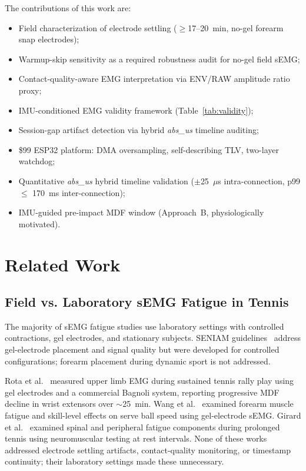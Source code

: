 \documentclass[sensors,article,submit,pdftex,moreauthors]{Definitions/mdpi}
\begin{document}
The contributions of this work are:
\begin{itemize}
  \item[(C1)] Field characterization of electrode settling ($\geq$17--20~min,
    no-gel forearm snap electrodes);
  \item[(C2)] Warmup-skip sensitivity as a required robustness audit for no-gel field sEMG;
  \item[(C3)] Contact-quality-aware EMG interpretation via ENV/RAW amplitude ratio proxy;
  \item[(C4)] IMU-conditioned EMG validity framework (Table~\ref{tab:validity});
  \item[(C5)] Session-gap artifact detection via hybrid \textit{abs\_us} timeline auditing;
  \item[(C6)] \$99 ESP32 platform: DMA oversampling, self-describing TLV, two-layer watchdog;
  \item[(C7)] Quantitative \textit{abs\_us} hybrid timeline validation ($\pm$25~$\mu$s
    intra-connection, p99 $\leq$ 170~ms inter-connection);
  \item[(C8)] IMU-guided pre-impact MDF window (Approach~B, physiologically motivated).
\end{itemize}

\section{Related Work}
\label{sec:related}

\subsection{Field vs. Laboratory sEMG Fatigue in Tennis}

The majority of sEMG fatigue studies use laboratory settings with controlled contractions,
gel electrodes, and stationary subjects. SENIAM guidelines~\cite{hermens2000} address
gel-electrode placement and signal quality but were developed for controlled configurations;
forearm placement during dynamic sport is not addressed.

Rota et al.~\cite{rota2014} measured upper limb EMG during sustained tennis rally play
using gel electrodes and a commercial Bagnoli system, reporting progressive MDF decline
in wrist extensors over $\sim$25~min. Wang et al.~\cite{wanglh2019} examined forearm
muscle fatigue and skill-level effects on serve ball speed using gel-electrode sEMG.
Girard et al.~\cite{girard2011} examined spinal and peripheral fatigue components during
prolonged tennis using neuromuscular testing at rest intervals. None of these works
addressed electrode settling artifacts, contact-quality monitoring, or timestamp
continuity; their laboratory settings made these unnecessary.
\end{document}
